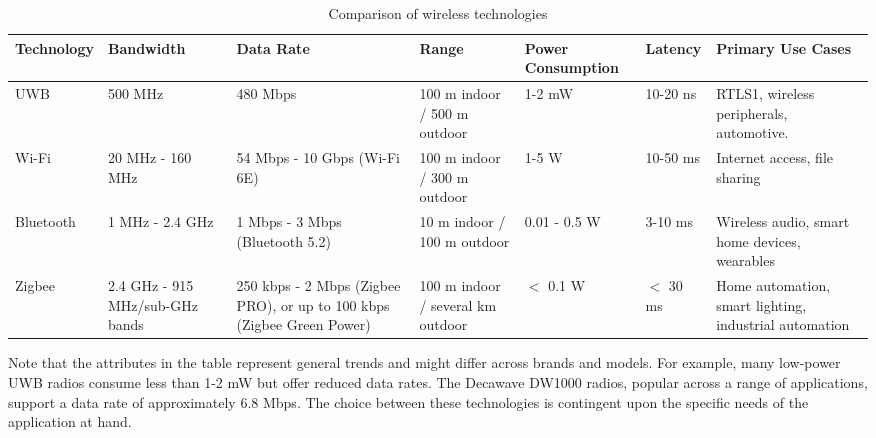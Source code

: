 \begin{table}[htbp]
\centering
\begin{tabularx}{\textwidth}{|l|X|X|X|X|l|X|}
\hline
Technology               & Bandwidth                         & Data Rate                                                                & Range                               & Power Consumption & Latency         & Primary Use Cases                                        \\
\hline
UWB                      & 500 MHz                           & 480 Mbps                                                                 & 100 m indoor / 500 m   outdoor      & 1-2 mW            & 10-20 ns        & RTLS1, wireless   peripherals, automotive.               \\
\hline
Wi-Fi                    & 20 MHz - 160 MHz                  & 54 Mbps - 10 Gbps   (Wi-Fi 6E)                                           & 100 m indoor / 300 m   outdoor      & 1-5 W             & 10-50 ms        & Internet access, file   sharing                          \\
\hline
Bluetooth                & 1 MHz - 2.4 GHz                   & 1 Mbps - 3 Mbps   (Bluetooth 5.2)                                        & 10 m indoor / 100 m   outdoor       & 0.01 - 0.5 W      & 3-10 ms         & Wireless audio, smart   home devices, wearables          \\
\hline
Zigbee & 2.4 GHz - 915   MHz/sub-GHz bands & 250 kbps - 2 Mbps   (Zigbee PRO), or up to 100 kbps (Zigbee Green Power) & 100 m indoor /   several km outdoor & $<$ 0.1 W            & $<$ 30 ms          & Home automation,   smart lighting, industrial automation \\
\hline
\end{tabularx}
\caption{Comparison of wireless technologies}
\end{table}

Note that the attributes in the table represent general trends and might differ across brands and models. For example, many low-power UWB radios consume less than 1-2 mW but offer reduced data rates. The Decawave DW1000 radios, popular across a range of applications, support a data rate of approximately 6.8 Mbps\cite{DW1000_product_brief}. The choice between these technologies is contingent upon the specific needs of the application at hand.



